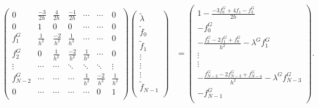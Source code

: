 \documentclass[a4paper, 12pt, twoside, openright]{article}
\numberwithin{equation}{section}
\begin{document}
\begin{align*}
\begin{pmatrix}
0 & \frac{-3}{2h} & \frac{4}{2h} & \frac{-1}{2h} & \cdots & \cdots & 0 \\
0 & 1 & 0 & 0 & \cdots & \cdots & 0 \\
f^G_1 & \frac{1}{h^2} & \frac{-2}{h^2} & \frac{1}{h^2} & \cdots & \cdots & 0 \\
f^G_2 & 0 & \frac{1}{h^2} & \frac{-2}{h^2} & \frac{1}{h^2} & \cdots & 0\\ 
\vdots & \cdots & \cdots & \ddots & \ddots & \ddots & \vdots \\
f^G_{N-2} & \cdots & \cdots & \cdots & \frac{1}{h^2} & \frac{-2}{h^2} & \frac{1}{h^2}\\ 
0 & \cdots & \cdots & \cdots & \cdots & 0 & 1 \\
\end{pmatrix} 
\begin{pmatrix}
\tilde \lambda \\
\tilde f_0 \\
\tilde f_1 \\
\vdots \\
\vdots \\
\vdots \\
\tilde f_{N-1} \\ 
\end{pmatrix}
&=
\begin{pmatrix}
1 - \frac{-3f^G_0 + 4f_1-f^G_3}{2h}\\
-f^G_0\\
-\frac{f^G_2-2f^G_1+f^G_0}{h^2} - \lambda^G f^G_1\\
\vdots \\
\vdots \\
-\frac{f^G_{N-2}-2f^G_{N-3}+f^G_{N-4}}{h^2} - \lambda^G f^G_{N-3}\\
-f^G_{N-1}\\
\end{pmatrix}.
\end{align*}
\end{document}
